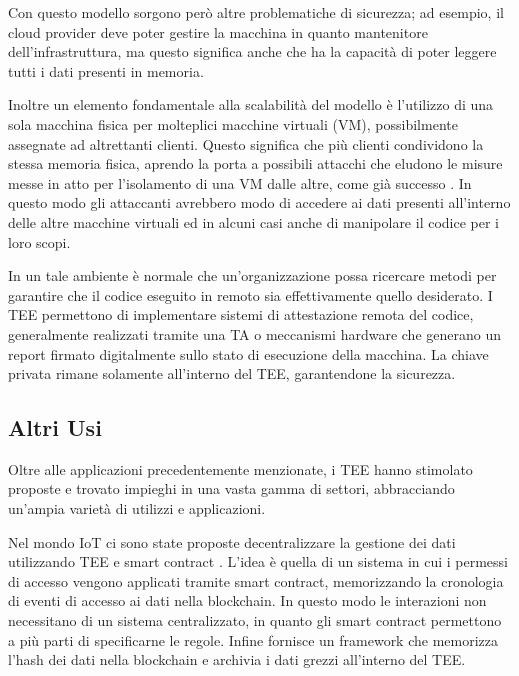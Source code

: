 \documentclass[12pt,italian]{report}
\begin{document}
	Con questo modello sorgono però altre problematiche di sicurezza; ad esempio, il cloud provider deve poter gestire la macchina in quanto mantenitore dell'infrastruttura, ma questo significa anche che ha la capacità di poter leggere tutti i dati presenti in memoria.
	
	Inoltre un elemento fondamentale alla scalabilità del modello è l'utilizzo di una sola macchina fisica per molteplici macchine virtuali (VM), possibilmente assegnate ad altrettanti clienti. Questo significa che più clienti condividono la stessa memoria fisica, aprendo la porta a possibili attacchi che eludono le misure messe in atto per l'isolamento di una VM dalle altre, come già successo \cite{vmescape1} \cite{vmescape2} \cite{vmescape3}. In questo modo gli attaccanti avrebbero modo di accedere ai dati presenti all'interno delle altre macchine virtuali ed in alcuni casi anche di manipolare il codice per i loro scopi.
	
	\bigbreak
	
	In un tale ambiente è normale che un'organizzazione possa ricercare metodi per garantire che il codice eseguito in remoto sia effettivamente quello desiderato. I TEE permettono di implementare sistemi di attestazione remota del codice, generalmente realizzati tramite una TA o meccanismi hardware che generano un report firmato digitalmente sullo stato di esecuzione della macchina. La chiave privata rimane solamente all'interno del TEE, garantendone la sicurezza.
	
	\subsection{Altri Usi}
	\label{subsec:altri-usi}
	Oltre alle applicazioni precedentemente menzionate, i TEE hanno stimolato proposte e trovato impieghi in una vasta gamma di settori, abbracciando un'ampia varietà di utilizzi e applicazioni.
	
	\bigbreak
	
	Nel mondo IoT ci sono state proposte decentralizzare la gestione dei dati utilizzando TEE e smart contract \cite{iotblockchain}. L'idea è quella di un sistema in cui i permessi di accesso vengono applicati tramite smart contract, memorizzando la cronologia di eventi di accesso ai dati nella blockchain. In questo modo le interazioni non necessitano di un sistema centralizzato, in quanto gli smart contract permettono a più parti di specificarne le regole. Infine fornisce un framework che memorizza l'hash dei dati nella blockchain e archivia i dati grezzi all'interno del TEE.
	
\end{document}
